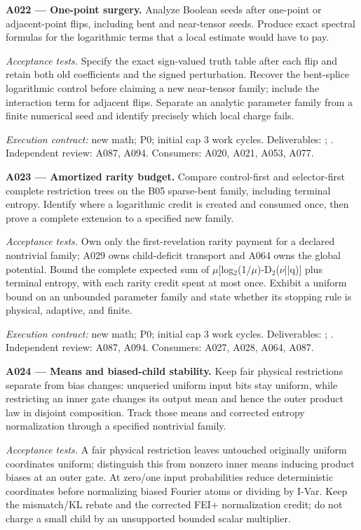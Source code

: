 \documentclass[11pt]{article}
\begin{document}
\textbf{A022 --- One-point surgery.} Analyze Boolean seeds after one-point or adjacent-point flips, including bent and near-tensor seeds. Produce exact spectral formulas for the logarithmic terms that a local estimate would have to pay.

\emph{Acceptance tests.} Specify the exact sign-valued truth table after each flip and retain both old coefficients and the signed perturbation. Recover the bent-splice logarithmic control before claiming a new near-tensor family; include the interaction term for adjacent flips. Separate an analytic parameter family from a finite numerical seed and identify precisely which local charge fails.

{\small\emph{Execution contract:} new math; P0; initial cap 3 work cycles. Deliverables: ; . Independent review: A087, A094. Consumers: A020, A021, A053, A077.}

\textbf{A023 --- Amortized rarity budget.} Compare control-first and selector-first complete restriction trees on the B05 sparse-bent family, including terminal entropy. Identify where a logarithmic credit is created and consumed once, then prove a complete extension to a specified new family.

\emph{Acceptance tests.} Own only the first-revelation rarity payment for a declared nontrivial family; A029 owns child-deficit transport and A064 owns the global potential. Bound the complete expected sum of $\mu$[log$_2$(1/$\mu$)-D$_2$($\nu$||q)] plus terminal entropy, with each rarity credit spent at most once. Exhibit a uniform bound on an unbounded parameter family and state whether its stopping rule is physical, adaptive, and finite.

{\small\emph{Execution contract:} new math; P0; initial cap 3 work cycles. Deliverables: ; . Independent review: A087, A094. Consumers: A027, A028, A064, A087.}

\textbf{A024 --- Means and biased-child stability.} Keep fair physical restrictions separate from bias changes: unqueried uniform input bits stay uniform, while restricting an inner gate changes its output mean and hence the outer product law in disjoint composition. Track those means and corrected entropy normalization through a specified nontrivial family.

\emph{Acceptance tests.} A fair physical restriction leaves untouched originally uniform coordinates uniform; distinguish this from nonzero inner means inducing product biases at an outer gate. At zero/one input probabilities reduce deterministic coordinates before normalizing biased Fourier atoms or dividing by I-Var. Keep the mismatch/KL rebate and the corrected FEI+ normalization credit; do not charge a small child by an unsupported bounded scalar multiplier.
\end{document}
